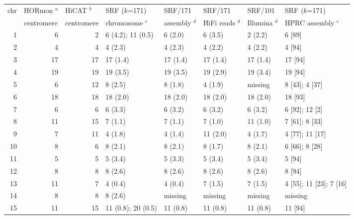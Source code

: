 \documentclass{bioinfo}
\begin{document}
\begin{table*}[!tb]
{\label{tab:eval}
\begin{tabular*}{\textwidth}{@{\extracolsep{\fill}}rrrlllll}
\toprule
\multirow{2}{*}{chr} & \multicolumn{1}{l}{HORmon $^a$}& \multicolumn{1}{l}{HiCAT $^b$} & SRF ($k$=171)  & \multicolumn{1}{l}{SRF/171}  & \multicolumn{1}{l}{SRF/171}    & \multicolumn{1}{l}{SRF/101}  & SRF ($k$=171) \\
                     & \multicolumn{1}{l}{centromere} & \multicolumn{1}{l}{centromere} & chromosome $^c$& \multicolumn{1}{l}{assembly $^d$} & \multicolumn{1}{l}{HiFi reads $^d$} & \multicolumn{1}{l}{Illumina $^d$} & HPRC assembly $^e$\\
\midrule
1  & 6  & 2  & 6 (4.2); 11 (0.5) & 6 (2.0)  & 6 (3.5)  & 2 (2.2)  & 6 [89] \\
2  & 4  & 4  & 4 (2.3)           & 4 (2.3)  & 4 (2.2)  & 4 (2.2)  & 4 [94] \\
3  & 17 & 17 & 17 (1.4)          & 17 (1.4) & 17 (1.4) & 17 (1.4) & 17 [94] \\
4  & 19 & 19 & 19 (3.5)          & 19 (3.5) & 19 (2.9) & 19 (3.4) & 19 [94] \\
5  & 6  & 12 & 8 (2.5)           & 8 (1.8)  & 4 (1.9)  & missing  & 8 [43]; 4 [37] \\
6  & 18 & 18 & 18 (2.0)          & 18 (2.0) & 18 (2.0) & 18 (2.0) & 18 [93] \\
7  & 6  & 6  & 6 (3.3)           & 6 (3.2)  & 6 (3.2)  & 6 (3.2)  & 6 [92]; 12 [2] \\
8  & 11 & 15 & 7 (1.1)           & 7 (1.1)  & 7 (1.0)  & 11 (1.0) & 7 [61]; 8 [33] \\
9  & 7  & 11 & 4 (1.8)           & 4 (1.4)  & 11 (2.0) & 4 (1.7)  & 4 [77]; 11 [17] \\
10 & 8  & 6  & 8 (2.1)           & 8 (2.1)  & 8 (1.7)  & 8 (2.1)  & 6 [66]; 8 [28] \\
11 & 5  & 5  & 5 (3.4)           & 5 (3.3)  & 5 (3.4)  & 5 (3.4)  & 5 [94] \\
12 & 8  & 8  & 8 (2.6)           & 8 (2.6)  & 8 (2.6)  & 8 (2.6)  & 8 [94] \\
13 & 11 & 7  & 4 (0.4)           & 4 (0.4)  & 7 (1.5)  & 7 (1.5)  & 4 [55]; 11 [23]; 7 [16] \\
14 & 8  & 8  & 8 (2.6)           & missing  & missing  & missing  & missing \\
15 & 11 & 15 & 11 (0.8); 20 (0.5)& 11 (0.8) & 11 (0.8) & 11 (0.8) & 11 [94] \\

\end{tabular*}}
\end{table*}
\end{document}
